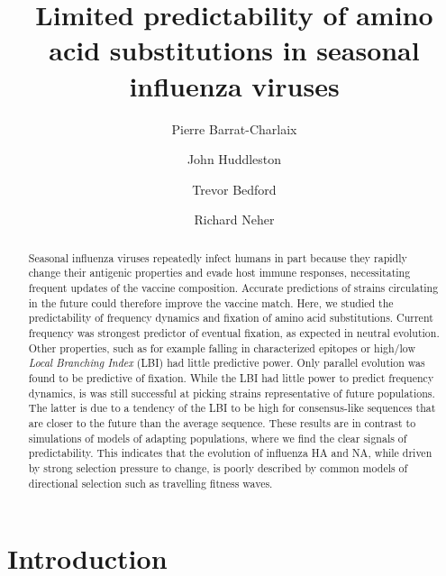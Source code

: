 \documentclass[reprint,amsmath,amssymb,superscriptaddress,showpacs,pre]{revtex4-1}
\begin{document}
\title{Limited predictability of amino acid substitutions in seasonal influenza viruses}
\date{} 					

\author{Pierre Barrat-Charlaix} 
%
\author{John Huddleston}
%
\author{Trevor Bedford}
%
\author{Richard Neher}

\begin{abstract}
	Seasonal influenza viruses repeatedly infect humans in part because they rapidly change their antigenic properties and evade host immune responses, necessitating frequent updates of the vaccine composition. 
	Accurate predictions of strains circulating in the future could therefore improve the vaccine match. 
	Here, we studied the predictability of frequency dynamics and fixation of amino acid substitutions.
	Current frequency was strongest predictor of eventual fixation, as expected in neutral evolution. 
    Other properties, such as for example falling in characterized epitopes or high/low \emph{Local Branching Index} (LBI) had little predictive power. 
	Only parallel evolution was found to be predictive of fixation. 
	While the LBI had little power to predict frequency dynamics, is was still successful at picking strains representative of future populations. 
	The latter is due to a tendency of the LBI to be high for consensus-like sequences that are closer to the future than the average sequence. 
	These results are in contrast to simulations of models of adapting populations, where we find the clear signals of predictability. 
	This indicates that the evolution of influenza HA and NA, while driven by strong selection pressure to change, is poorly described by common models of directional selection such as travelling fitness waves.  
\end{abstract}

\maketitle

\section*{Introduction} %
\label{sec:introduction}
	
\end{document}
